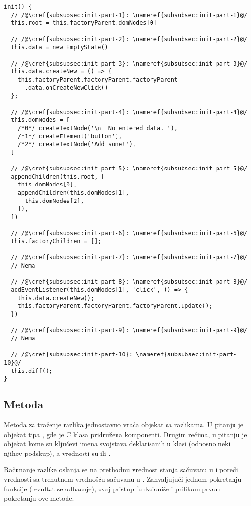 \begin{lstlisting}
init() {
  // /@\cref{subsubsec:init-part-1}: \nameref{subsubsec:init-part-1}@/
  this.root = this.factoryParent.domNodes[0]

  // /@\cref{subsubsec:init-part-2}: \nameref{subsubsec:init-part-2}@/
  this.data = new EmptyState()

  // /@\cref{subsubsec:init-part-3}: \nameref{subsubsec:init-part-3}@/
  this.data.createNew = () => {
    this.factoryParent.factoryParent.factoryParent
      .data.onCreateNewClick()
  };

  // /@\cref{subsubsec:init-part-4}: \nameref{subsubsec:init-part-4}@/
  this.domNodes = [
    /*0*/ createTextNode('\n  No entered data. '),
    /*1*/ createElement('button'),
    /*2*/ createTextNode('Add some!'),
  ]
  
  // /@\cref{subsubsec:init-part-5}: \nameref{subsubsec:init-part-5}@/
  appendChildren(this.root, [
    this.domNodes[0],
    appendChildren(this.domNodes[1], [
      this.domNodes[2],
    ]),
  ])

  // /@\cref{subsubsec:init-part-6}: \nameref{subsubsec:init-part-6}@/
  this.factoryChildren = [];

  // /@\cref{subsubsec:init-part-7}: \nameref{subsubsec:init-part-7}@/
  // Nema

  // /@\cref{subsubsec:init-part-8}: \nameref{subsubsec:init-part-8}@/
  addEventListener(this.domNodes[1], 'click', () => {
    this.data.createNew();
    this.factoryParent.factoryParent.factoryParent.update();
  })

  // /@\cref{subsubsec:init-part-9}: \nameref{subsubsec:init-part-9}@/
  // Nema

  // /@\cref{subsubsec:init-part-10}: \nameref{subsubsec:init-part-10}@/
  this.diff();
}
\end{lstlisting}

\subsection{Metoda }
\label{subsec:metoda-diff}

Metoda za traženje razlika jednostavno vraća objekat sa razlikama.
U pitanju je objekat tipa , gde je \code C klasa pridružena komponenti.
Drugim rečima, u pitanju je objekat kome su ključevi imena svojstava deklarisanih u klasi (odnosno neki njihov podskup), a vrednosti su  ili .

Računanje razlike oslanja se na prethodnu vrednost stanja sačuvanu u  i poredi vrednosti sa trenutnom vrednošću sačuvanu u .
Zahvaljujući jednom pokretanju funkcije   (rezultat se odbacuje), ovaj pristup funkcioniše i prilikom prvom pokretanju ove metode.

